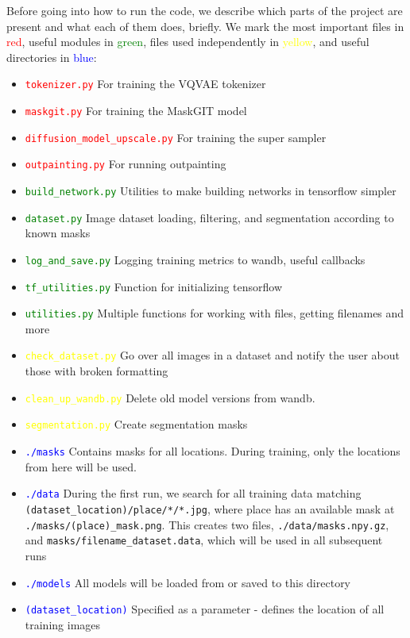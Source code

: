 Before going into how to run the code, we describe which parts of the project are present and what each of them does, briefly. We mark the most important files in \textcolor{red}{red}, useful modules in \textcolor{green}{green}, files used independently in \textcolor{yellow}{yellow}, and useful directories in \textcolor{blue}{blue}:
\begin{itemize}
    \item \textcolor{red}{\texttt{tokenizer.py}} For training the VQVAE tokenizer
    \item \textcolor{red}{\texttt{maskgit.py}} For training the MaskGIT model
    \item \textcolor{red}{\texttt{diffusion\_model\_upscale.py}} For training the super sampler
    \item \textcolor{red}{\texttt{outpainting.py}} For running outpainting

    \item \textcolor{green}{\texttt{build\_network.py}} Utilities to make building networks in tensorflow simpler
    \item \textcolor{green}{\texttt{dataset.py}} Image dataset loading, filtering, and segmentation according to known masks
    \item \textcolor{green}{\texttt{log\_and\_save.py}} Logging training metrics to wandb, useful callbacks
    \item \textcolor{green}{\texttt{tf\_utilities.py}} Function for initializing tensorflow
    \item \textcolor{green}{\texttt{utilities.py}} Multiple functions for working with files, getting filenames and more

    \item \textcolor{yellow}{\texttt{check\_dataset.py}} Go over all images in a dataset and notify the user about those with broken formatting
    \item \textcolor{yellow}{\texttt{clean\_up\_wandb.py}} Delete old model versions from wandb.
    \item \textcolor{yellow}{\texttt{segmentation.py}} Create segmentation masks

    \item \textcolor{blue}{\texttt{./masks}} Contains masks for all locations. During training, only the locations from here will be used.
    \item \textcolor{blue}{\texttt{./data}} During the first run, we search for all training data matching \texttt{(dataset_location)/place/*/*.jpg}, where place has an available mask at \texttt{./masks/(place)\_mask.png}. This creates two files, \texttt{./data/masks.npy.gz}, and \texttt{masks/filename_dataset.data}, which will be used in all subsequent runs
    \item \textcolor{blue}{\texttt{./models}} All models will be loaded from or saved to this directory
    \item \textcolor{blue}{\texttt{(dataset_location)}} Specified as a parameter - defines the location of all training images
\end{itemize}


